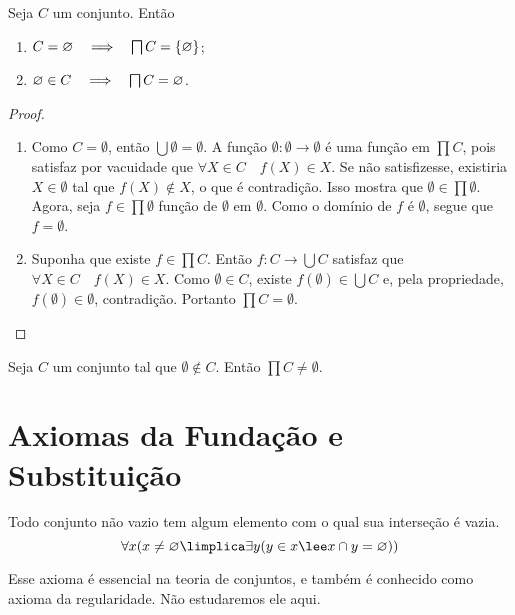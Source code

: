 \begin{prop}
Seja $C$ um conjunto. Então
	\begin{enumerate}
	\item $C = \emptyset \entao \prod C = \{\emptyset\}$;
	\item $\emptyset \in C \entao \prod C = \emptyset$.
	\end{enumerate}
\end{prop}
\begin{proof}
	\begin{enumerate}
	\item Como $C=\emptyset$, então $\bigcup \emptyset = \emptyset$. A função $\emptyset: \emptyset \to \emptyset$ é uma função em $\prod C$, pois satisfaz por vacuidade que $\forall X \in C \quad f(X) \in X$. Se não satisfizesse, existiria $X \in \emptyset$ tal que $f(X) \notin X$, o que é contradição. Isso mostra que $\emptyset \in \prod \emptyset$. Agora, seja $f \in \prod \emptyset$ função de $\emptyset$ em $\emptyset$. Como o domínio de $f$ é $\emptyset$, segue que $f=\emptyset$.
	
	\item Suponha que existe $f \in \prod C$. Então $f: C \to \bigcup C$ satisfaz que $\forall X \in C \quad f(X) \in X$. Como $\emptyset \in C$, existe $f(\emptyset) \in \bigcup C$ e, pela propriedade, $f(\emptyset) \in \emptyset$, contradição. Portanto $\prod C = \emptyset$.
	\end{enumerate}
\end{proof}

\begin{axi}[Escolha]
Seja $C$ um conjunto tal que $\emptyset \notin C$. Então $\prod C \neq \emptyset$.
\end{axi}


\section{Axiomas da Fundação e Substituição}

\begin{axi}[Fundação]
Todo conjunto não vazio tem algum elemento com o qual sua interseção é vazia.
	\begin{equation*}
	\forall x(x \neq \emptyset \limplica \exists y(y \in x \lee x \cap y = \emptyset))
	\end{equation*}
\end{axi}

Esse axioma é essencial na teoria de conjuntos, e também é conhecido como axioma da regularidade. Não estudaremos ele aqui.

